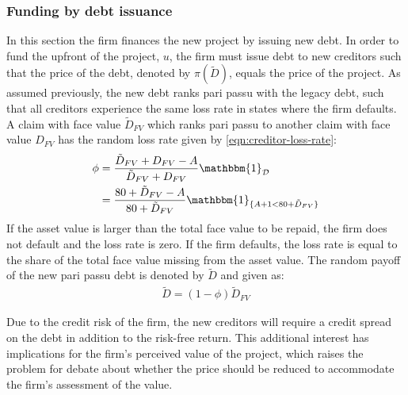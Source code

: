 \documentclass[main.tex]{subfiles}
\begin{document}
    \subsubsection{Funding by debt issuance}\label{sec:example-risk-free-project-debt-issuance}
        In this section the firm finances the new project by issuing new debt.
        In order to fund the upfront of the project, $u$, 
        the firm must issue debt to new creditors such that the price of the debt, 
        denoted by $\pi(\tilde{D})$, equals the price of the project.
        As assumed previously, the new debt ranks pari passu with the legacy debt, 
        such that all creditors experience the same loss rate in states where the firm defaults.
        A claim with face value $\tilde{D}_{FV}$ which ranks pari passu to another claim 
        with face value $D_{FV}$ has the random loss rate given by \cref{eqn:creditor-loss-rate}:
            \begin{align}
                \phi
                &=
                    \frac{
                        \tilde{D}_{FV} + D_{FV} - A
                    }{
                        \tilde{D}_{FV} + D_{FV}
                    }
                    \mathbbm{1}_{\mathcal{D}}
                \nonumber \\
                &=
                    \frac{
                        \num{80} + \tilde{D}_{FV} - A
                    }{
                        \num{80} + \tilde{D}_{FV}
                    }
                    \mathbbm{1}_{\{A + \num{1} < \num{80} + \tilde{D}_{FV}\}} 
            \end{align}
        If the asset value is larger than the total face value to be repaid,
        the firm does not default and the loss rate is zero.
        If the firm defaults, the loss rate is equal to the share of the total face value missing from the asset value.
        The random payoff of the new pari passu debt is denoted by $\tilde{D}$ and given as:
            \begin{align}
                \tilde{D}
                    = (1 - \phi)\tilde{D}_{FV}
            \end{align}

        Due to the credit risk of the firm, the new creditors will require a credit spread on the debt 
        in addition to the risk-free return.
        This additional interest has implications for the firm's perceived value of the project, 
        which raises the problem for debate about whether the price should be reduced 
        to accommodate the firm's assessment of the value.
\end{document}
